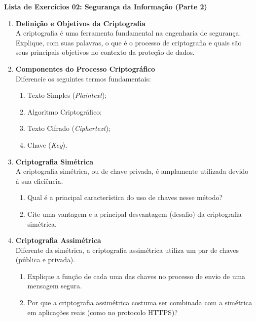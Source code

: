 \documentclass[12pt]{article}
\begin{document}
\begin{center}
    \textcolor{meuazul}{\Large \textbf{Lista de Exercícios 02: Segurança da Informação (Parte 2)}}
\end{center}

\vspace{0.8cm}

\begin{enumerate}[label=\textbf{Questão \arabic*:}, leftmargin=2.2cm, labelsep=0.5cm]

    \item \textbf{Definição e Objetivos da Criptografia} \\
    A criptografia é uma ferramenta fundamental na engenharia de segurança. Explique, com suas palavras, o que é o processo de criptografia e quais são seus principais objetivos no contexto da proteção de dados.

    \item \textbf{Componentes do Processo Criptográfico} \\
    Diferencie os seguintes termos fundamentais:
    \begin{enumerate}[label=\alph*)]
        \item Texto Simples (\textit{Plaintext});
        \item Algoritmo Criptográfico;
        \item Texto Cifrado (\textit{Ciphertext});
        \item Chave (\textit{Key}).
    \end{enumerate}

    \item \textbf{Criptografia Simétrica} \\
    A criptografia simétrica, ou de chave privada, é amplamente utilizada devido à sua eficiência.
    \begin{enumerate}[label=\alph*)]
        \item Qual é a principal característica do uso de chaves nesse método?
        \item Cite uma vantagem e a principal desvantagem (desafio) da criptografia simétrica.
    \end{enumerate}

    \item \textbf{Criptografia Assimétrica} \\
    Diferente da simétrica, a criptografia assimétrica utiliza um par de chaves (pública e privada).
    \begin{enumerate}[label=\alph*)]
        \item Explique a função de cada uma das chaves no processo de envio de uma mensagem segura.
        \item Por que a criptografia assimétrica costuma ser combinada com a simétrica em aplicações reais (como no protocolo HTTPS)?
    \end{enumerate}

\end{enumerate}
\end{document}
